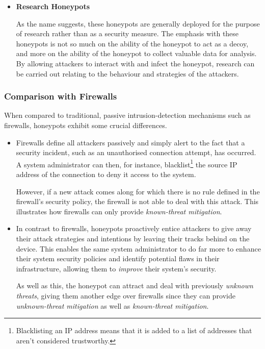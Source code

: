 \begin{itemize}
	
	\item \textbf{Research Honeypots}
	
	As the name suggests, these honeypots are generally deployed for the purpose of research rather than as a security measure. The emphasis with these honeypots is not so much on the ability of the honeypot to act as a decoy, and more on the ability of the honeypot to collect valuable data for analysis. By allowing attackers to interact with and infect the honeypot, research can be carried out relating to the behaviour and strategies of the attackers.
	
\end{itemize}

\subsubsection{Comparison with Firewalls}

When compared to traditional, passive intrusion-detection mechanisms such as firewalls, honeypots exhibit some crucial differences. 

\begin{itemize}
\item Firewalls define all attackers passively and simply alert to the fact that a security incident, such as an unauthorised connection attempt, has occurred. A system administrator can then, for instance, blacklist\footnote{Blacklisting an IP address means that it is added to a list of addresses that aren't considered trustworthy.} the source IP address of the connection to deny it access to the system. 

However, if a new attack comes along for which there is no rule defined in the firewall's security policy, the firewall is not able to deal with this attack. This illustrates how firewalls can only provide \textit{known-threat mitigation}.
\item In contrast to firewalls, honeypots proactively entice attackers to give away their attack strategies and intentions by leaving their tracks behind on the device. This enables the same system administrator to do far more to enhance their system security policies and identify potential flaws in their infrastructure, allowing them to \textit{improve} their system's security. 

As well as this, the honeypot can attract and deal with previously \textit{unknown threats}, giving them another edge over firewalls since they can provide \textit{unknown-threat mitigation} as well as \textit{known-threat mitigation}.
\end{itemize}

